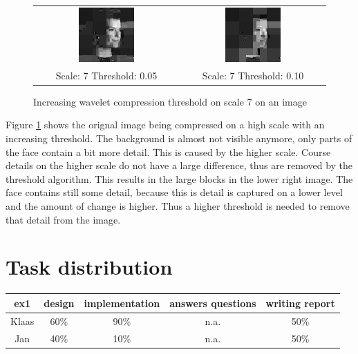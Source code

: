 \documentclass[a4paper]{article}
\begin{document}
\begin{enumerate}
\begin{figure}[H]
\begin{tabular}{cc}
 \includegraphics[width=0.4\textwidth]{../lab3ex3/l7t005.png} & \includegraphics[width=0.4\textwidth]{../lab3ex3/l7t010.png}  \\
 Scale: 7 Threshold: 0.05 & Scale: 7 Threshold: 0.10 
\end{tabular}
\caption{Increasing wavelet compression threshold on scale 7 on an image}
\label{fig:scale7}
\end{figure}

Figure \ref{fig:scale7} shows the orignal image being compressed on a high scale with an increasing threshold.
The background is almost not visible anymore, only parts of the face contain a bit more detail.
This is caused by the higher scale. Course details on the higher scale do not have a large difference, thus are removed by the
threshold algorithm. This results in the large blocks in the lower right image.
The face contains still some detail, because this is detail is captured on a lower level and the amount of change is higher.
Thus a higher threshold is needed to remove that detail from the image.



\end{enumerate}

\newpage
\section*{Task distribution}

\begin{table}[H]
\centering
\begin{tabular}{ccccc}
ex1 & design & implementation & answers questions & writing report \\
\hline
Klaas & 60\% & 90\% & n.a. & 50\% \\
\hline
Jan & 40\% & 10\% & n.a. & 50\% \\
\end{tabular}
\end{table}
\end{document}
